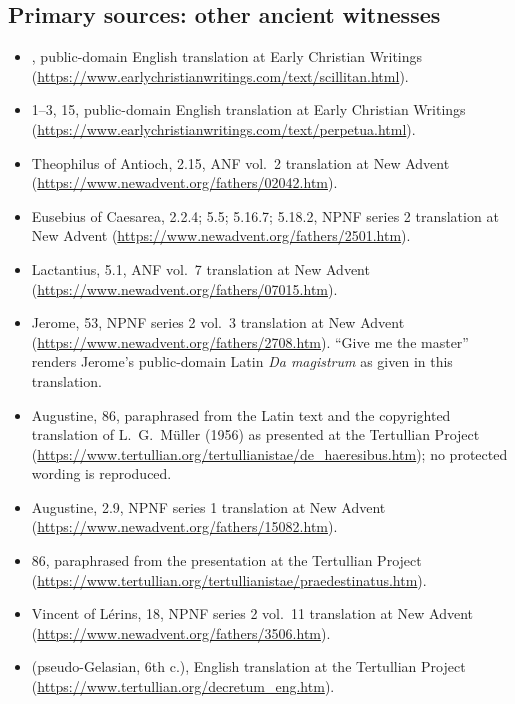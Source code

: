 \subsection*{Primary sources: other ancient witnesses}

\begin{itemize}
\item {}, public-domain English translation
at Early Christian Writings
(\url{https://www.earlychristianwritings.com/text/scillitan.html}).
\item {} 1--3, 15, public-domain English
translation at Early Christian Writings
(\url{https://www.earlychristianwritings.com/text/perpetua.html}).
\item Theophilus of Antioch,  2.15, ANF vol.~2 translation
at New Advent (\url{https://www.newadvent.org/fathers/02042.htm}).
\item Eusebius of Caesarea,  2.2.4; 5.5; 5.16.7;
5.18.2, NPNF series 2 translation at New Advent
(\url{https://www.newadvent.org/fathers/2501.htm}).
\item Lactantius,  5.1, ANF vol.~7 translation at New
Advent (\url{https://www.newadvent.org/fathers/07015.htm}).
\item Jerome,  53, NPNF series 2 vol.~3 translation
at New Advent (\url{https://www.newadvent.org/fathers/2708.htm}). ``Give me
the master'' renders Jerome's public-domain Latin \textit{Da magistrum} as
given in this translation.
\item Augustine,  86, paraphrased from the Latin text and
the copyrighted translation of L.~G.~M\"uller (1956) as presented at the
Tertullian Project
(\url{https://www.tertullian.org/tertullianistae/de_haeresibus.htm}); no
protected wording is reproduced.
\item Augustine,  2.9, NPNF series 1
translation at New Advent
(\url{https://www.newadvent.org/fathers/15082.htm}).
\item {} 86, paraphrased from the presentation at the
Tertullian Project
(\url{https://www.tertullian.org/tertullianistae/praedestinatus.htm}).
\item Vincent of L\'erins,  18, NPNF series 2 vol.~11
translation at New Advent (\url{https://www.newadvent.org/fathers/3506.htm}).
\item {} (pseudo-Gelasian, 6th c.), English
translation at the Tertullian Project
(\url{https://www.tertullian.org/decretum_eng.htm}).
\end{itemize}

